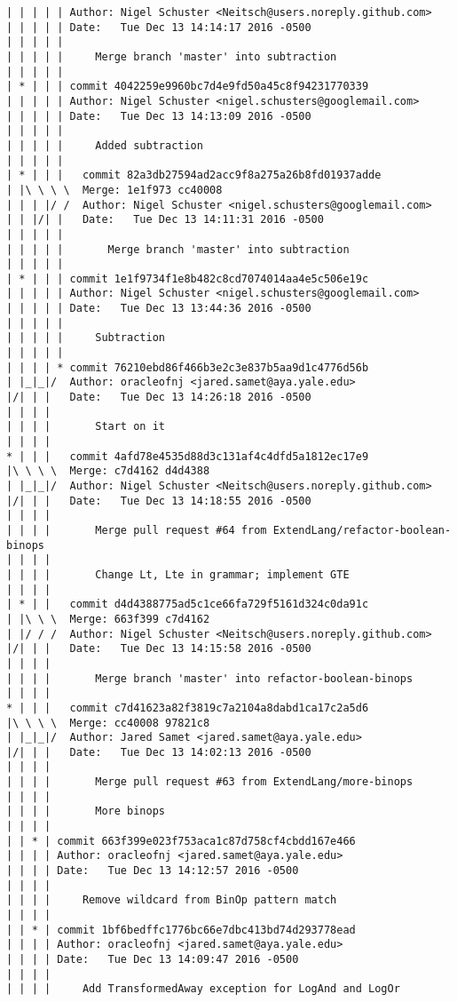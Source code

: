 \begin{lstlisting}
| | | | | Author: Nigel Schuster <Neitsch@users.noreply.github.com>
| | | | | Date:   Tue Dec 13 14:14:17 2016 -0500
| | | | | 
| | | | |     Merge branch 'master' into subtraction
| | | | |      
| * | | | commit 4042259e9960bc7d4e9fd50a45c8f94231770339
| | | | | Author: Nigel Schuster <nigel.schusters@googlemail.com>
| | | | | Date:   Tue Dec 13 14:13:09 2016 -0500
| | | | | 
| | | | |     Added subtraction
| | | | |        
| * | | |   commit 82a3db27594ad2acc9f8a275a26b8fd01937adde
| |\ \ \ \  Merge: 1e1f973 cc40008
| | | |/ /  Author: Nigel Schuster <nigel.schusters@googlemail.com>
| | |/| |   Date:   Tue Dec 13 14:11:31 2016 -0500
| | | | |   
| | | | |       Merge branch 'master' into subtraction
| | | | |      
| * | | | commit 1e1f9734f1e8b482c8cd7074014aa4e5c506e19c
| | | | | Author: Nigel Schuster <nigel.schusters@googlemail.com>
| | | | | Date:   Tue Dec 13 13:44:36 2016 -0500
| | | | | 
| | | | |     Subtraction
| | | | |      
| | | | * commit 76210ebd86f466b3e2c3e837b5aa9d1c4776d56b
| |_|_|/  Author: oracleofnj <jared.samet@aya.yale.edu>
|/| | |   Date:   Tue Dec 13 14:26:18 2016 -0500
| | | |   
| | | |       Start on it
| | | |       
* | | |   commit 4afd78e4535d88d3c131af4c4dfd5a1812ec17e9
|\ \ \ \  Merge: c7d4162 d4d4388
| |_|_|/  Author: Nigel Schuster <Neitsch@users.noreply.github.com>
|/| | |   Date:   Tue Dec 13 14:18:55 2016 -0500
| | | |   
| | | |       Merge pull request #64 from ExtendLang/refactor-boolean-binops
| | | |       
| | | |       Change Lt, Lte in grammar; implement GTE
| | | |       
| * | |   commit d4d4388775ad5c1ce66fa729f5161d324c0da91c
| |\ \ \  Merge: 663f399 c7d4162
| |/ / /  Author: Nigel Schuster <Neitsch@users.noreply.github.com>
|/| | |   Date:   Tue Dec 13 14:15:58 2016 -0500
| | | |   
| | | |       Merge branch 'master' into refactor-boolean-binops
| | | |       
* | | |   commit c7d41623a82f3819c7a2104a8dabd1ca17c2a5d6
|\ \ \ \  Merge: cc40008 97821c8
| |_|_|/  Author: Jared Samet <jared.samet@aya.yale.edu>
|/| | |   Date:   Tue Dec 13 14:02:13 2016 -0500
| | | |   
| | | |       Merge pull request #63 from ExtendLang/more-binops
| | | |       
| | | |       More binops
| | | |     
| | * | commit 663f399e023f753aca1c87d758cf4cbdd167e466
| | | | Author: oracleofnj <jared.samet@aya.yale.edu>
| | | | Date:   Tue Dec 13 14:12:57 2016 -0500
| | | | 
| | | |     Remove wildcard from BinOp pattern match
| | | |     
| | * | commit 1bf6bedffc1776bc66e7dbc413bd74d293778ead
| | | | Author: oracleofnj <jared.samet@aya.yale.edu>
| | | | Date:   Tue Dec 13 14:09:47 2016 -0500
| | | | 
| | | |     Add TransformedAway exception for LogAnd and LogOr

\end{lstlisting}

